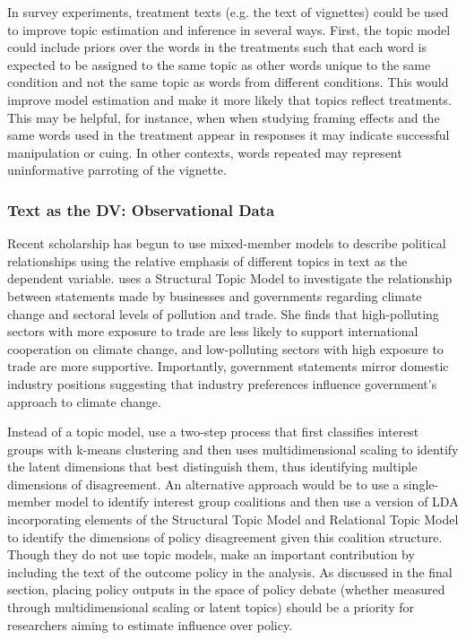 \documentclass{article}
\begin{document}
In survey experiments, treatment texts (e.g. the text of vignettes) could be used to improve topic estimation and inference in several ways.  First, the topic model could include priors over the words in the treatments such that each word is expected to be assigned to the same topic as other words unique to the same condition and not the same topic as words from different conditions. This would improve model estimation and make it more likely that topics reflect treatments. This may be helpful, for instance, when when studying framing effects and the same words used in the treatment appear in responses it may indicate successful manipulation or cuing. In other contexts, words repeated may represent uninformative parroting of the vignette.

\subsubsection{Text as the DV: Observational Data}

Recent scholarship has begun to use mixed-member models to describe political relationships using the relative emphasis of different topics in text as the dependent variable. 
\citet{Genovese2017SectorsFrom} uses a Structural Topic Model to investigate the relationship between statements made by businesses and governments regarding climate change and sectoral levels of pollution and trade. She finds that high-polluting sectors with more exposure to trade are less likely to support international cooperation on climate change, and low-polluting sectors with high exposure to trade are more supportive. Importantly, government statements mirror domestic industry positions suggesting that industry preferences influence government's approach to climate change.

Instead of a topic model,
\citet{Kluver2015} use a two-step process that first classifies interest groups with k-means clustering and then uses multidimensional scaling to identify the latent dimensions that best distinguish them, thus identifying multiple dimensions of disagreement. An alternative approach would be to use a single-member model to identify interest group coalitions and then use a version of LDA incorporating elements of the Structural Topic Model and Relational Topic Model to identify the dimensions of policy disagreement given this coalition structure. Though they do not use topic models, \citet{Kluver2015} make an important contribution by including the text of the outcome policy in the analysis. As discussed in the final section, placing policy outputs in the space of policy debate (whether measured through multidimensional scaling or latent topics) should be a priority for researchers aiming to estimate influence over policy. 
\end{document}
